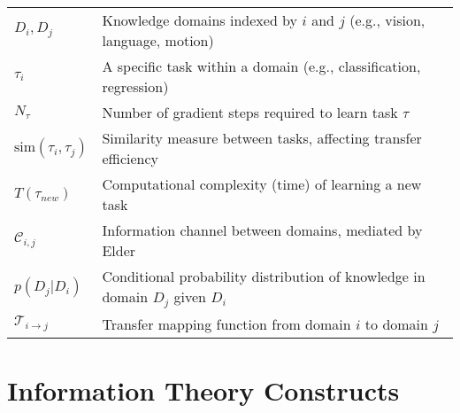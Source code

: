 \begin{tabular}{p{3cm} p{12cm}}
$D_i, D_j$ & Knowledge domains indexed by $i$ and $j$ (e.g., vision, language, motion) \\
$\tau_i$ & A specific task within a domain (e.g., classification, regression) \\
$N_{\tau}$ & Number of gradient steps required to learn task $\tau$ \\
$\text{sim}(\tau_i, \tau_j)$ & Similarity measure between tasks, affecting transfer efficiency \\
$T(\tau_{new})$ & Computational complexity (time) of learning a new task \\
$\mathcal{C}_{i,j}$ & Information channel between domains, mediated by Elder \\
$p(D_j|D_i)$ & Conditional probability distribution of knowledge in domain $D_j$ given $D_i$ \\
$\mathcal{T}_{i \to j}$ & Transfer mapping function from domain $i$ to domain $j$ \\
\end{tabular}

\section*{Information Theory Constructs}

